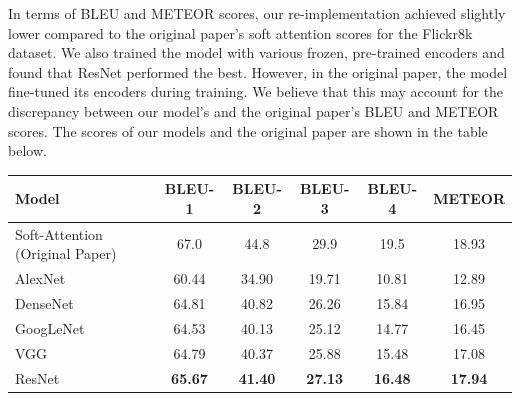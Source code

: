 \documentclass{article}
\begin{document}

In terms of BLEU and METEOR scores, our re-implementation achieved slightly lower compared to the original paper's soft attention scores for the Flickr8k dataset. We also trained the model with various frozen, pre-trained encoders and found that ResNet performed the best. However, in the original paper, the model fine-tuned its encoders during training. We believe that this may account for the discrepancy between our model's and the original paper's BLEU and METEOR scores. The scores of our models and the original paper are shown in the table below.

\begin{table}[h]
\centering
\begin{adjustbox}{width=.75\textwidth}
\small
\begin{tabular}{lccccc}
\toprule
Model & BLEU-1 & BLEU-2 & BLEU-3 & BLEU-4 & METEOR \\
\midrule
Soft-Attention (Original Paper) & 67.0 & 44.8 & 29.9 & 19.5 & 18.93 \\
AlexNet                & 60.44 & 34.90 & 19.71 & 10.81 & 12.89 \\
DenseNet               & 64.81 & 40.82 & 26.26 & 15.84 & 16.95 \\
GoogLeNet              & 64.53 & 40.13 & 25.12 & 14.77 & 16.45 \\
VGG                    & 64.79 & 40.37 & 25.88 & 15.48 & 17.08 \\
ResNet                 & \textbf{65.67} & \textbf{41.40} & \textbf{27.13} & \textbf{16.48} & \textbf{17.94} \\
\bottomrule
\end{tabular}
\end{adjustbox}
\end{table}
\end{document}
